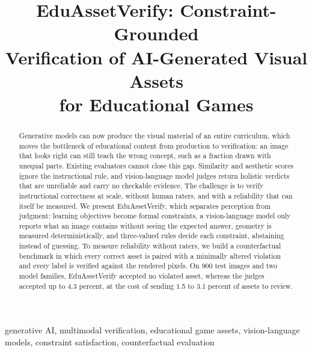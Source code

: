 \documentclass[conference]{IEEEtran}
\begin{document}

\title{EduAssetVerify: Constraint-Grounded\\
Verification of AI-Generated Visual Assets\\
for Educational Games}

\author{
}

\maketitle

\begin{abstract}
Generative models can now produce the visual material of an entire curriculum, which moves the bottleneck of educational content from production to verification: an image that looks right can still teach the wrong concept, such as a fraction drawn with unequal parts. Existing evaluators cannot close this gap. Similarity and aesthetic scores ignore the instructional rule, and vision-language model judges return holistic verdicts that are unreliable and carry no checkable evidence. The challenge is to verify instructional correctness at scale, without human raters, and with a reliability that can itself be measured. We present EduAssetVerify, which separates perception from judgment: learning objectives become formal constraints, a vision-language model only reports what an image contains without seeing the expected answer, geometry is measured deterministically, and three-valued rules decide each constraint, abstaining instead of guessing. To measure reliability without raters, we build a counterfactual benchmark in which every correct asset is paired with a minimally altered violation and every label is verified against the rendered pixels. On 900 test images and two model families, EduAssetVerify accepted no violated asset, whereas the judges accepted up to 4.3 percent, at the cost of sending 1.5 to 3.1 percent of assets to review.
\end{abstract}

\begin{IEEEkeywords}
generative AI, multimodal verification, educational game assets, vision-language models, constraint satisfaction, counterfactual evaluation
\end{IEEEkeywords}
\end{document}
